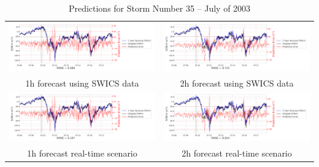 \documentclass[draft,sw]{agutexSI2019}
\begin{document}
\begin{table}
\centering
\begin{tabular}{cc}
\includegraphics[width=0.49\linewidth]{paper_plots_shade/1h_swics/1h_swics_storm_35.png}
&
\includegraphics[width=0.49\linewidth]{paper_plots_shade/2h_swics/2h_swics_storm_35.png}
\\
1h forecast using SWICS data & 2h forecast using SWICS data
\vspace*{12pt}
\\
\includegraphics[width=0.49\linewidth]{paper_plots_shade/1h_rt/1h_rt_storm_35.png}
&
\includegraphics[width=0.49\linewidth]{paper_plots_shade/2h_rt/2h_rt_storm_35.png}
\\
1h forecast real-time scenario & 2h forecast real-time scenario 
\vspace*{12pt}
\\
\end{tabular}
\caption{Predictions for Storm Number 35 -- July of 2003}
\label{storm-35}
\end{table}
\end{document}
